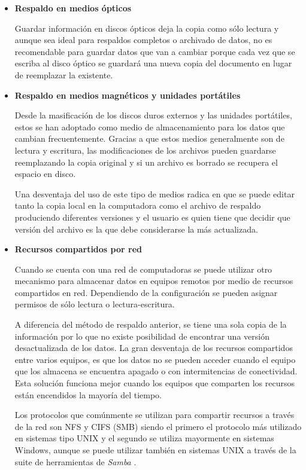 \newpage
    \begin{itemize}

      \item \textbf{Respaldo en medios \'{opticos}}

Guardar informaci\'{o}n en discos \'{o}pticos deja la copia como s\'{o}lo lectura y aunque sea ideal para respaldos completos o archivado de datos, no es recomendable para guardar datos que van a cambiar porque cada vez que se escriba al disco \'{o}ptico se guardar\'{a} una nueva copia del documento en lugar de reemplazar la existente.

      \item \textbf{Respaldo en medios magn\'{e}ticos y unidades port\'{a}tiles}

Desde la masificaci\'{o}n de los discos duros externos y las unidades port\'{a}tiles, estos se han adoptado como medio de almacenamiento para los datos que cambian frecuentemente. Gracias a que estos medios generalmente son de lectura y escritura, las modificaciones de los archivos pueden guardarse reemplazando la copia original y si un archivo es borrado se recupera el espacio en disco.

Una desventaja del uso de este tipo de medios radica en que se puede editar tanto la copia local en la computadora como el archivo de respaldo produciendo diferentes versiones y el usuario es quien tiene que decidir que versi\'{o}n del archivo es la que debe considerarse la m\'{a}s actualizada.

      \item \textbf{Recursos compartidos por red}

Cuando se cuenta con una red de computadoras se puede utilizar otro mecanismo para almacenar datos en equipos remotos por medio de recursos compartidos en red. Dependiendo de la configuraci\'{o}n se pueden asignar permisos de s\'{o}lo lectura o lectura-escritura.

A diferencia del m\'{e}todo de respaldo anterior, se tiene una sola copia de la informaci\'{o}n por lo que no existe posibilidad de encontrar una versi\'{o}n desactualizada de los datos. La gran desventaja de los recursos compartidos entre varios equipos, es que los datos no se pueden acceder cuando el equipo que los almacena se encuentra apagado o con intermitencias de conectividad. Esta soluci\'{o}n funciona mejor cuando los equipos que comparten los recursos est\'{a}n encendidos la mayor\'{i}a del tiempo.

Los protocolos que com\'{u}nmente se utilizan para compartir recursos a trav\'{e}s de la red son \textsc{NFS} y \textsc{CIFS} (\textsc{SMB}) siendo el primero el protocolo m\'{a}s utilizado en sistemas tipo \textsc{UNIX} y el segundo se utiliza mayormente en sistemas Windows, aunque se puede utilizar tambi\'{e}n en sistemas \textsc{UNIX} a trav\'{e}s de la suite de herramientas de \textit{Samba} \cite{_samba_????}.


\end{itemize}
